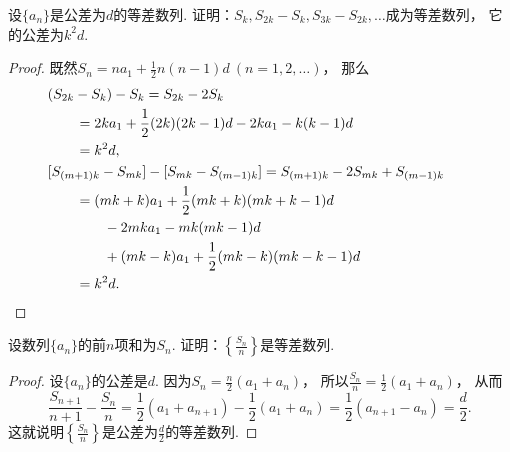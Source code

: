 \begin{example}
设\(\{a_n\}\)是公差为\(d\)的等差数列.
证明：\(S_k,S_{2k}-S_k,S_{3k}-S_{2k},\dotsc\)成为等差数列，
它的公差为\(k^2 d\).
\begin{proof}
既然\(S_n = n a_1 + \frac12 n(n-1) d\ (n=1,2,\dotsc)\)，
那么\begin{align*}
	&\hspace{-20pt}
	(S_{2k}-S_k) - S_k
	= S_{2k} - 2 S_k \\
	&= 2k a_1 + \frac12 (2k)(2k-1) d
	- 2 k a_1 - k(k-1) d \\
	&= k^2 d, \\
	&\hspace{-20pt}
	[S_{(m+1)k}-S_{mk}] - [S_{mk}-S_{(m-1)k}]
	= S_{(m+1)k} - 2 S_{mk} + S_{(m-1)k} \\
	&= (mk+k) a_1 + \frac12 (mk+k)(mk+k-1) d \\
	&\hspace{20pt}
	- 2 mk a_1 - mk (mk-1) d \\
	&\hspace{20pt}
	+ (mk-k) a_1 + \frac12 (mk-k)(mk-k-1) d \\
	&= k^2 d.
	\qedhere
\end{align*}
\end{proof}
\end{example}

\begin{example}
设数列\(\{a_n\}\)的前\(n\)项和为\(S_n\).
证明：\(\left\{\frac{S_n}{n}\right\}\)是等差数列.
\begin{proof}
设\(\{a_n\}\)的公差是\(d\).
因为\(S_n=\frac{n}2(a_1+a_n)\)，
所以\(\frac{S_n}{n}=\frac12(a_1+a_n)\)，
从而\begin{equation*}
	\frac{S_{n+1}}{n+1}-\frac{S_n}{n}
	= \frac12(a_1+a_{n+1})-\frac12(a_1+a_n)
	= \frac12(a_{n+1}-a_n)
	= \frac{d}2.
\end{equation*}
这就说明\(\left\{\frac{S_n}{n}\right\}\)是公差为\(\frac{d}2\)的等差数列.
\end{proof}
\end{example}

